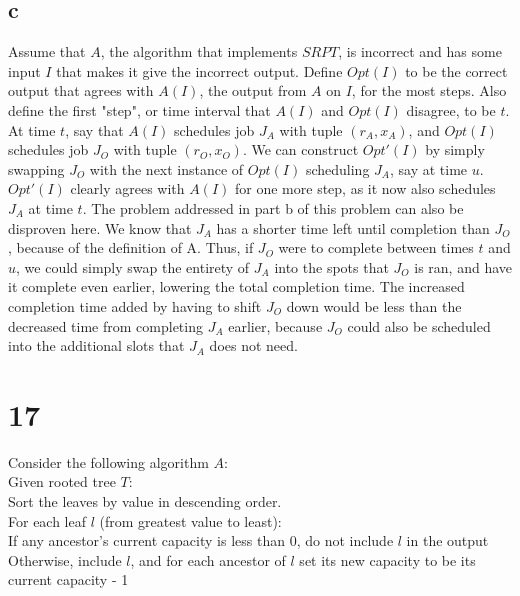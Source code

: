 \documentclass[letterpaper,notitlepage,twoside]{article}
\newcommand\tab[1][1cm]{\hspace*{#1}} %
\begin{document}
\subsection*{c}
Assume that $A$, the algorithm that implements $SRPT$, is incorrect and has some input $I$ that makes it give the incorrect output. Define $Opt(I)$ to be the correct output that agrees with $A(I)$, the output from $A$ on $I$, for the most steps. Also define the first "step", or time interval that $A(I)$ and $Opt(I)$ disagree, to be $t$. At time $t$, say that $A(I)$ schedules job $J_A$ with tuple $(r_A, x_A)$, and $Opt(I)$ schedules job $J_O$ with tuple $(r_O, x_O)$. We can construct $Opt'(I)$ by simply swapping $J_O$ with the next instance of $Opt(I)$ scheduling $J_A$, say at time $u$. \\
$Opt'(I)$ clearly agrees with $A(I)$ for one more step, as it now also schedules $J_A$ at time $t$. The problem addressed in part b of this problem can also be disproven here. We know that $J_A$ has a shorter time left until completion than $J_O$, because of the definition of A. Thus, if $J_O$ were to complete between times $t$ and $u$, we could simply swap the entirety of $J_A$ into the spots that $J_O$ is ran, and have it complete even earlier, lowering the total completion time. The increased completion time added by having to shift $J_O$ down would be less than the decreased time from completing $J_A$ earlier, because $J_O$ could also be scheduled into the additional slots that $J_A$ does not need.  

\section*{17}
Consider the following algorithm $A$:\\
Given rooted tree $T$:\\
\tab Sort the leaves by value in descending order.\\
\tab For each leaf $l$ (from greatest value to least): \\ 
\tab\tab If any ancestor's current capacity is less than 0, do not include $l$ in the output \\
\tab\tab Otherwise, include $l$, and for each ancestor of $l$ set its new capacity to be its current capacity - 1 \\
\end{document}
